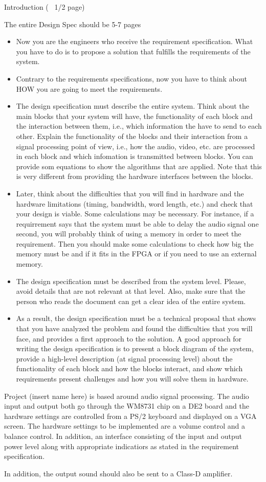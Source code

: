 Introduction (~ 1/2 page)

The entire Design Spec should be 5-7 pages

\begin{itemize}
\item Now you are the engineers who receive the requirement specification. What you have to do is to propose a solution that fulfills the requirements of the system.
\item Contrary to the requirements specifications, now you have to think about HOW you are going to meet  the requirements.
\item The design specification must describe the entire system. Think about the main blocks that your system will have, the functionality of each block and the interaction between them, i.e., which information the have to send to each other. Explain the functionality of the blocks and their interaction from a signal processing point of view, i.e., how the audio, video, etc. are processed in each block and which infomation is transmitted between blocks. You can provide som equations to show the algorithms that are applied. Note that this is very different from providing the hardware interfaces between the blocks.
\item Later, think about the difficulties that you will find in hardware and the hardware limitations (timing, bandwidth, word length, etc.) and check that your design is viable. Some calculations may be necessary. For instance, if a requirrement says that the system must be able to delay the audio signal one second, you will probably think of using a memory in order to meet the requirement. Then you should make some calculations to check how big the memory must be and if it fits in the FPGA or if you need to use an external memory.
\item The design specification must be described from the system level. Please, avoid details that are not relevant at that level. Also, make sure that the person who reads the document can get a clear idea of the entire system.
\item As a result, the design specification must be a technical proposal that shows that you have analyzed the problem and found the difficulties that you will face, and provides a first approach to the solution. A good approach for writing the design specification is to present a block diagram of the system, provide a high-level description (at signal processing level) about the functionality of each block and how the blocks interact, and show which requirements present challenges and how you will solve them in hardware.
\end{itemize}

Project (insert name here) is based around audio signal processing. The audio input and output both go through the WM8731 chip on a DE2 board and the hardware settings are controlled from a PS/2 keyboard and displayed on a VGA screen. The hardware settings to be implemented are a volume control and a balance control. In addition, an interface consisting of the input and output power level along with appropriate indicatiors as stated in the requirement specification.

In addition, the output sound should also be sent to a Class-D amplifier.
